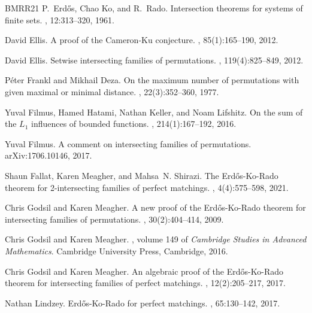 \documentclass[10pt,a4paper]{article}
\theoremstyle{definition}
\begin{document}
\begin{thebibliography}{BMRR21}
P.~Erd\H{o}s, Chao Ko, and R.~Rado.
\newblock Intersection theorems for systems of finite sets.
, 12:313--320, 1961.

David Ellis.
\newblock A proof of the {C}ameron-{K}u conjecture.
, 85(1):165--190, 2012.

David Ellis.
\newblock Setwise intersecting families of permutations.
, 119(4):825--849, 2012.

P\'{e}ter Frankl and Mikhail Deza.
\newblock On the maximum number of permutations with given maximal or minimal
  distance.
, 22(3):352--360, 1977.

Yuval Filmus, Hamed Hatami, Nathan Keller, and Noam Lifshitz.
\newblock On the sum of the {$L_1$} influences of bounded functions.
, 214(1):167--192, 2016.

Yuval Filmus.
\newblock A comment on intersecting families of permutations.
\newblock arXiv:1706.10146, 2017.

Shaun Fallat, Karen Meagher, and Mahsa~N. Shirazi.
\newblock The {E}rd{\H{o}}s-{K}o-{R}ado theorem for 2-intersecting families of
  perfect matchings.
, 4(4):575--598, 2021.

Chris Godsil and Karen Meagher.
\newblock A new proof of the {E}rd{\H{o}}s-{K}o-{R}ado theorem for intersecting
  families of permutations.
, 30(2):404--414, 2009.

Chris Godsil and Karen Meagher.
, volume
  149 of {\em Cambridge Studies in Advanced Mathematics}.
\newblock Cambridge University Press, Cambridge, 2016.

Chris Godsil and Karen Meagher.
\newblock An algebraic proof of the {E}rd{\H{o}}s-{K}o-{R}ado theorem for
  intersecting families of perfect matchings.
, 12(2):205--217, 2017.

Nathan Lindzey.
\newblock Erd{\H{o}}s-{K}o-{R}ado for perfect matchings.
, 65:130--142, 2017.


\end{thebibliography}
\end{document}
